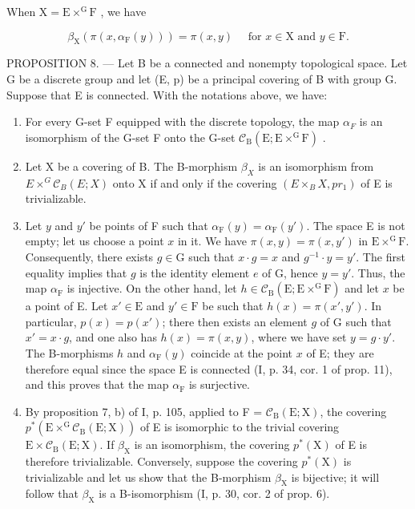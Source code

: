 When \(\mathrm{X} = \mathrm{E}\times^{\mathrm{G}}\mathrm{F}\) , we have

\[
\beta_ {\mathrm{X}} \left(\pi \left(x, \alpha_ {\mathrm{F}} (y)\right)\right) = \pi (x, y) \quad \text {   for   } x \in \mathrm{X} \text {   and   } y \in \mathrm{F}.\tag{4}
\]

PROPOSITION 8. --- Let B be a connected and nonempty topological space. Let G be a discrete group and let (E, p) be a principal covering of B with group G. Suppose that E is connected. With the notations above, we have:

\begin{enumerate}
\def\labelenumi{\alph{enumi})}
\item
  For every G-set F equipped with the discrete topology, the map \(\alpha_{F}\) is an isomorphism of the G-set F onto the G-set \(\mathcal{C}_{\mathrm{B}}(\mathrm{E};\mathrm{E}\times^{\mathrm{G}}\mathrm{F})\) .
\item
  Let X be a covering of B. The B-morphism \(\beta_{X}\) is an isomorphism from \(E \times^{G} \mathcal{C}_{B}(E; X)\) onto X if and only if the covering \((E \times_{B} X, pr_{1})\) of E is trivializable.
\item
  Let \(y\) and \(y'\) be points of F such that \(\alpha_{\mathrm{F}}(y) = \alpha_{\mathrm{F}}(y')\). The space E is not empty; let us choose a point \(x\) in it. We have \(\pi(x, y) = \pi(x, y')\) in \(\mathrm{E} \times^{\mathrm{G}} \mathrm{F}\). Consequently, there exists \(g \in \mathrm{G}\) such that \(x \cdot g = x\) and \(g^{-1} \cdot y = y'\). The first equality implies that \(g\) is the identity element \(e\) of G, hence \(y = y'\). Thus, the map \(\alpha_{\mathrm{F}}\) is injective. On the other hand, let \(h \in \mathcal{C}_{\mathrm{B}}(\mathrm{E}; \mathrm{E} \times^{\mathrm{G}} \mathrm{F})\) and let \(x\) be a point of E. Let \(x' \in \mathrm{E}\) and \(y' \in \mathrm{F}\) be such that \(h(x) = \pi(x', y')\). In particular, \(p(x) = p(x')\); there then exists an element \(g\) of G such that \(x' = x \cdot g\), and one also has \(h(x) = \pi(x, y)\), where we have set \(y = g \cdot y'\). The B-morphisms \(h\) and \(\alpha_{\mathrm{F}}(y)\) coincide at the point \(x\) of E; they are therefore equal since the space E is connected (I, p. 34, cor. 1 of prop. 11), and this proves that the map \(\alpha_{\mathrm{F}}\) is surjective.
\item
  By proposition 7, b) of I, p. 105, applied to F = \(\mathcal{C}_{\mathrm{B}}(\mathrm{E};\mathrm{X})\), the covering \(p^{*}(\mathrm{E}\times^{\mathrm{G}}\mathcal{C}_{\mathrm{B}}(\mathrm{E};\mathrm{X}))\) of E is isomorphic to the trivial covering \(\mathrm{E}\times \mathcal{C}_{\mathrm{B}}(\mathrm{E};\mathrm{X})\). If \(\beta_{\mathrm{X}}\) is an isomorphism, the covering \(p^{*}(\mathrm{X})\) of E is therefore trivializable. Conversely, suppose the covering \(p^{*}(\mathrm{X})\) is trivializable and let us show that the B-morphism \(\beta_{\mathrm{X}}\) is bijective; it will follow that \(\beta_{\mathrm{X}}\) is a B-isomorphism (I, p. 30, cor. 2 of prop. 6).
\end{enumerate}

